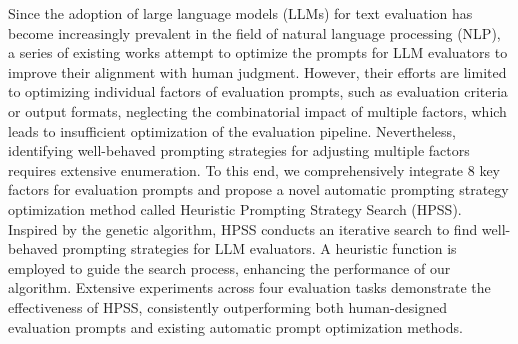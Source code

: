 Since the adoption of large language models (LLMs) for text evaluation has become increasingly prevalent in the field of natural language processing (NLP), a series of existing works attempt to optimize the prompts for LLM evaluators to improve their alignment with human judgment. 
However, their efforts are limited to optimizing individual factors of evaluation prompts, such as evaluation criteria or output formats, neglecting the combinatorial impact of multiple factors, which leads to insufficient optimization of the evaluation pipeline. 
Nevertheless, identifying well-behaved prompting strategies for adjusting multiple factors requires extensive enumeration.
To this end, we comprehensively integrate 8 key factors for evaluation prompts and propose a novel automatic prompting strategy optimization method called Heuristic Prompting Strategy Search (HPSS). 
Inspired by the genetic algorithm, HPSS conducts an iterative search to find well-behaved prompting strategies for LLM evaluators. 
A heuristic function is employed to guide the search process, enhancing the performance of our algorithm.
Extensive experiments across four evaluation tasks demonstrate the effectiveness of HPSS, consistently outperforming both human-designed evaluation prompts and existing automatic prompt optimization methods. 
